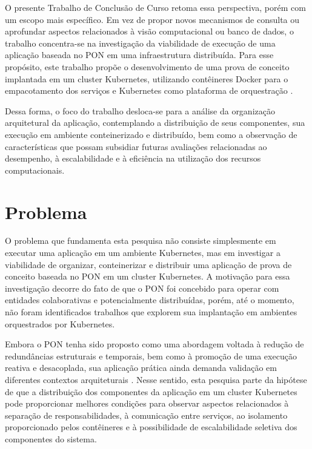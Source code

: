 O presente Trabalho de Conclusão de Curso retoma essa perspectiva, porém com um escopo mais específico. Em vez de propor novos mecanismos de consulta ou aprofundar aspectos relacionados à visão computacional ou banco de dados, o trabalho concentra-se na investigação da viabilidade de execução de uma aplicação baseada no PON em uma infraestrutura distribuída. Para esse propósito, este trabalho propõe o desenvolvimento de uma prova de conceito implantada em um cluster Kubernetes, utilizando contêineres Docker para o empacotamento dos serviços e Kubernetes como plataforma de orquestração \cite{kubernetes2026documentation}\cite{docker2026documentation}.

Dessa forma, o foco do trabalho desloca-se para a análise da organização arquitetural da aplicação, contemplando a distribuição de seus componentes, sua execução em ambiente conteinerizado e distribuído, bem como a observação de características que possam subsidiar futuras avaliações relacionadas ao desempenho, à escalabilidade e à eficiência na utilização dos recursos computacionais.


\section{Problema}

O problema que fundamenta esta pesquisa não consiste simplesmente em executar uma aplicação em um ambiente Kubernetes, mas em investigar a viabilidade de organizar, conteinerizar e distribuir uma aplicação de prova de conceito baseada no PON em um cluster Kubernetes. A motivação para essa investigação decorre do fato de que o PON foi concebido para operar com entidades colaborativas e potencialmente distribuídas, porém, até o momento, não foram identificados trabalhos que explorem sua implantação em ambientes orquestrados por Kubernetes.

Embora o PON tenha sido proposto como uma abordagem voltada à redução de redundâncias estruturais e temporais, bem como à promoção de uma execução reativa e desacoplada, sua aplicação prática ainda demanda validação em diferentes contextos arquiteturais \cite{kossoski2024applsci}. Nesse sentido, esta pesquisa parte da hipótese de que a distribuição dos componentes da aplicação em um cluster Kubernetes pode proporcionar melhores condições para observar aspectos relacionados à separação de responsabilidades, à comunicação entre serviços, ao isolamento proporcionado pelos contêineres e à possibilidade de escalabilidade seletiva dos componentes do sistema.

